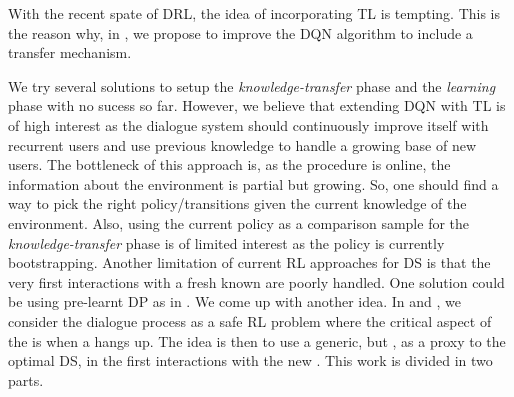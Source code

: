 With the recent spate of \acrfull{DRL}, the idea of incorporating \gls{TL} is tempting.
This is the reason why, in , %
we propose to improve the \gls{DQN} algorithm to include a transfer mechanism.

We try several solutions to setup the \textit{knowledge-transfer} phase and the \textit{learning} phase with no sucess so far. However, we believe that extending \gls{DQN} with \gls{TL} is of high interest as the dialogue system should continuously improve itself with recurrent users and use previous knowledge to handle a growing base of new users. The bottleneck of this approach is, as the procedure is online, the information about the environment is partial but growing. So, one should find a way to pick the right policy/transitions given the current knowledge of the environment. Also, using the current policy as a comparison sample for the \textit{knowledge-transfer} phase is of limited interest as the policy is currently bootstrapping.
%
Another limitation of current \gls{RL} approaches for \gls{DS} is that the very first interactions with a fresh known  are poorly handled. One solution could be using pre-learnt \acrfull{DP} as in . We come up with another idea. In  and , we consider the dialogue process as a safe \gls{RL} problem where the critical aspect of the  is when a  hangs up. The idea is then to use a generic, but , as a proxy to the optimal \gls{DS}, in the first interactions with the new . This work is divided in two parts.

